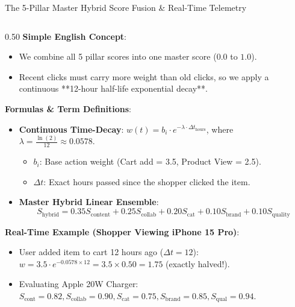 \documentclass[10pt]{beamer}
\begin{document}
\begin{frame}[fragile]{The 5-Pillar Master Hybrid Score Fusion \& Real-Time Telemetry}
\begin{columns}[T]
    \begin{column}{0.50\textwidth}
        {\color{brandred}\textbf{Simple English Concept}}:
        \begin{itemize}\scriptsize
            \item We combine all 5 pillar scores into one master score ($0.0$ to $1.0$).
            \item Recent clicks must carry more weight than old clicks, so we apply a continuous **12-hour half-life exponential decay**.
        \end{itemize}
        {\color{brandorange}\textbf{Formulas \& Term Definitions}}:
        \begin{itemize}\scriptsize
            \item \textbf{Continuous Time-Decay}: $w(t) = b_i \cdot e^{-\lambda \cdot \Delta t_{\text{hours}}}$, where $\lambda = \frac{\ln(2)}{12} \approx 0.0578$.
            \begin{itemize}\tiny
                \item $b_i$: Base action weight (Cart add = 3.5, Product View = 2.5).
                \item $\Delta t$: Exact hours passed since the shopper clicked the item.
            \end{itemize}
            \item \textbf{Master Hybrid Linear Ensemble}:
            $$S_{\text{hybrid}} = 0.35 S_{\text{content}} + 0.25 S_{\text{collab}} + 0.20 S_{\text{cat}} + 0.10 S_{\text{brand}} + 0.10 S_{\text{quality}}$$
        \end{itemize}
        {\color{brandred}\textbf{Real-Time Example (Shopper Viewing iPhone 15 Pro)}}:
        \begin{itemize}\scriptsize
            \item User added item to cart 12 hours ago ($\Delta t = 12$): $w = 3.5 \cdot e^{-0.0578 \times 12} = 3.5 \times 0.50 = \mathbf{1.75}$ (exactly halved!).
            \item Evaluating Apple 20W Charger: $S_{\text{cont}}=0.82, S_{\text{collab}}=0.90, S_{\text{cat}}=0.75, S_{\text{brand}}=0.85, S_{\text{qual}}=0.94$.

\end{itemize}
\end{column}
\end{columns}
\end{frame}
\end{document}
